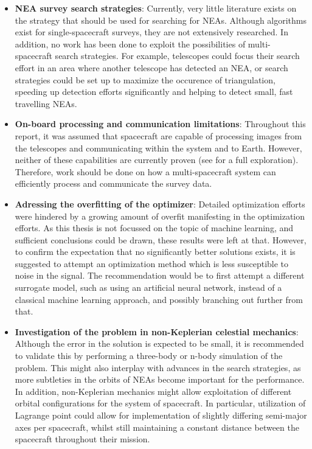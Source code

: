 \begin{itemize}
 \item \textbf{NEA survey search strategies}: Currently, very little literature exists on the strategy that should be used for searching for NEAs. Although algorithms exist for single-spacecraft surveys, they are not extensively researched. In addition, no work has been done to exploit the possibilities of multi-spacecraft search strategies. For example, telescopes could focus their search effort in an area where another telescope has detected an NEA, or search strategies could be set up to maximize the occurence of triangulation, speeding up detection efforts significantly and helping to detect small, fast travelling NEAs.
 \item \textbf{On-board processing and communication limitations}: Throughout this report, it was assumed that spacecraft are capable of processing images from the telescopes and communicating within the system and to Earth. However, neither of these capabilities are currently proven (see \cite{LiteratureReview} for a full exploration). Therefore, work should be done on how a multi-spacecraft system can efficiently process and communicate the survey data.
 \item \textbf{Adressing the overfitting of the optimizer}: Detailed optimization efforts were hindered by a growing amount of overfit manifesting in the optimization efforts. As this thesis is not focussed on the topic of machine learning, and sufficient conclusions could be drawn, these results were left at that. However, to confirm the expectation that no significantly better solutions exists, it is suggested to attempt an optimization method which is less susceptible to noise in the signal. The recommendation would be to first attempt a different surrogate model, such as using an artificial neural network, instead of a classical machine learning approach, and possibly branching out further from that.
 \item \textbf{Investigation of the problem in non-Keplerian celestial mechanics}: Although the error in the solution is expected to be small, it is recommended to validate this by performing a three-body or n-body simulation of the problem. This might also interplay with advances in the search strategies, as more subtleties in the orbits of NEAs become important for the performance. In addition, non-Keplerian mechanics might allow exploitation of different orbital configurations for the system of spacecraft. In particular, utilization of Lagrange point could allow for implementation of slightly differing semi-major axes per spacecraft, whilst still maintaining a constant distance between the spacecraft throughout their mission.
\end{itemize}
